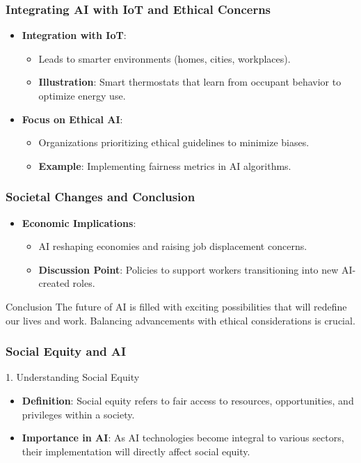 \documentclass[aspectratio=169]{beamer}
\begin{document}
\begin{frame}[fragile]
    \frametitle{Integrating AI with IoT and Ethical Concerns}
    \begin{itemize}
        \item \textbf{Integration with IoT}:
            \begin{itemize}
                \item Leads to smarter environments (homes, cities, workplaces).
                \item \textbf{Illustration}: Smart thermostats that learn from occupant behavior to optimize energy use.
            \end{itemize}
        \item \textbf{Focus on Ethical AI}:
            \begin{itemize}
                \item Organizations prioritizing ethical guidelines to minimize biases.
                \item \textbf{Example}: Implementing fairness metrics in AI algorithms.
            \end{itemize}
    \end{itemize}
\end{frame}

\begin{frame}[fragile]
    \frametitle{Societal Changes and Conclusion}
    \begin{itemize}
        \item \textbf{Economic Implications}:
            \begin{itemize}
                \item AI reshaping economies and raising job displacement concerns.
                \item \textbf{Discussion Point}: Policies to support workers transitioning into new AI-created roles.
            \end{itemize}
    \end{itemize}

    \begin{block}{Conclusion}
        The future of AI is filled with exciting possibilities that will redefine our lives and work. 
        Balancing advancements with ethical considerations is crucial.
    \end{block}
\end{frame}

\begin{frame}[fragile]
    \frametitle{Social Equity and AI}
    \begin{block}{1. Understanding Social Equity}
        \begin{itemize}
            \item \textbf{Definition}: Social equity refers to fair access to resources, opportunities, and privileges within a society.
            \item \textbf{Importance in AI}: As AI technologies become integral to various sectors, their implementation will directly affect social equity.
        \end{itemize}
    \end{block}
\end{frame}
\end{document}
